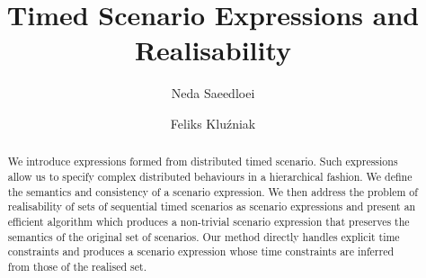 \documentclass[runningheads,a4paper]{llncs}
\begin{document}
\mainmatter  %

\title{Timed Scenario Expressions and Realisability}


\author{Neda Saeedloei\inst{*} \and Feliks Klu\'{z}niak}
%
%
%

%
%
%

\maketitle

\setcounter{footnote}{0}

\begin{abstract}
  We introduce expressions formed from distributed timed scenario.
  Such expressions allow us to specify complex distributed behaviours in a
  hierarchical fashion.
We define the semantics and consistency of a scenario
expression. We then address the problem of realisability of sets
of sequential timed scenarios as scenario expressions and
present an efficient algorithm which produces a non-trivial scenario
expression that preserves the semantics of the original set of
scenarios. Our method directly handles explicit time constraints
and produces a scenario expression whose time constraints are
inferred from those of the realised set.
\end{abstract}
\end{document}

